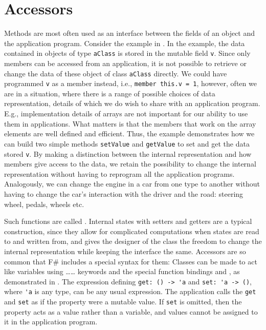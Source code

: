 \documentclass[fsharpNotes.tex]{subfiles}
\begin{document}
\section{Accessors}
Methods are most often used as an interface between the fields of an object and the application program. Consider the example in .
%
% 
In the example, the data contained in objects of type \lstinline{aClass} is stored in the mutable field \lstinline{v}. Since only members can be accessed from an application, it is not possible to retrieve or change the data of these object of class \lstinline{aClass} directly. We could have programmed \lstinline{v} as a member instead, i.e., \lstinline{member this.v = 1}, however, often we are in a situation, where there is a range of possible choices of data representation, details of which we do wish to share with an application program. E.g., implementation details of arrays are not important for our ability to use them in applications. What matters is that the members that work on the array elements are well defined and efficient. Thus, the example demonstrates how we can build two simple methods \lstinline{setValue} and \lstinline{getValue} to set and get the data stored \lstinline{v}. By making a distinction between the internal representation and how members give access to the data, we retain the possibility to change the internal representation without having to reprogram all the application programs. Analogously, we can change the engine in a car from one type to another without having to change the car's interaction with the driver and the road: steering wheel, pedals, wheels etc.

Such functions are called .  Internal states with setters and getters are a typical construction, since they allow for complicated computations when states are read to and written from, and gives the designer of the class the freedom to change the internal representation while keeping the interface the same. Accessors are so common that F\# includes a special syntax for them: Classes can be made to act like variables using \dots{}\dots{} keywords and the special function bindings  and , as demonstrated in .
%
% 
The expression defining \mbox{\lstinline{get: () -> 'a}} and \mbox{\lstinline{set: 'a -> ()}}, where \lstinline{'a} is any type, can be any usual expression. The application calls the \lstinline{get} and \lstinline{set} as if the property were a mutable value. If \lstinline{set} is omitted, then the property acts as a value rather than a variable, and values cannot be assigned to it in the application program.
\end{document}
